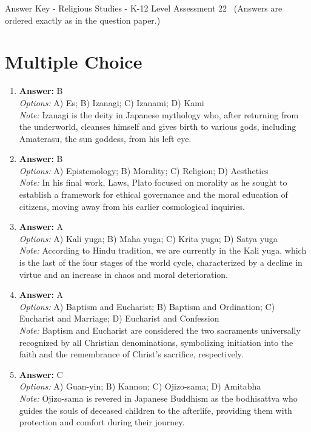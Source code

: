 \documentclass[12pt]{article}
\begin{document}
\begin{center}
Answer Key - Religious Studies - K-12 Level Assessment 22 \
\small (Answers are ordered exactly as in the question paper.)
\end{center}

\section*{Multiple Choice}
\begin{enumerate}[label=\arabic*.]
\item \textbf{Answer:} B
\\ \textit{Options:} A) Es; B) Izanagi; C) Izanami; D) Kami
\\ \textit{Note:} Izanagi is the deity in Japanese mythology who, after returning from the underworld, cleanses himself and gives birth to various gods, including Amaterasu, the sun goddess, from his left eye.
\item \textbf{Answer:} B
\\ \textit{Options:} A) Epistemology; B) Morality; C) Religion; D) Aesthetics
\\ \textit{Note:} In his final work, Laws, Plato focused on morality as he sought to establish a framework for ethical governance and the moral education of citizens, moving away from his earlier cosmological inquiries.
\item \textbf{Answer:} A
\\ \textit{Options:} A) Kali yuga; B) Maha yuga; C) Krita yuga; D) Satya yuga
\\ \textit{Note:} According to Hindu tradition, we are currently in the Kali yuga, which is the last of the four stages of the world cycle, characterized by a decline in virtue and an increase in chaos and moral deterioration.
\item \textbf{Answer:} A
\\ \textit{Options:} A) Baptism and Eucharist; B) Baptism and Ordination; C) Eucharist and Marriage; D) Eucharist and Confession
\\ \textit{Note:} Baptism and Eucharist are considered the two sacraments universally recognized by all Christian denominations, symbolizing initiation into the faith and the remembrance of Christ's sacrifice, respectively.
\item \textbf{Answer:} C
\\ \textit{Options:} A) Guan-yin; B) Kannon; C) Ojizo-sama; D) Amitabha
\\ \textit{Note:} Ojizo-sama is revered in Japanese Buddhism as the bodhisattva who guides the souls of deceased children to the afterlife, providing them with protection and comfort during their journey.
\end{enumerate}
\end{document}
